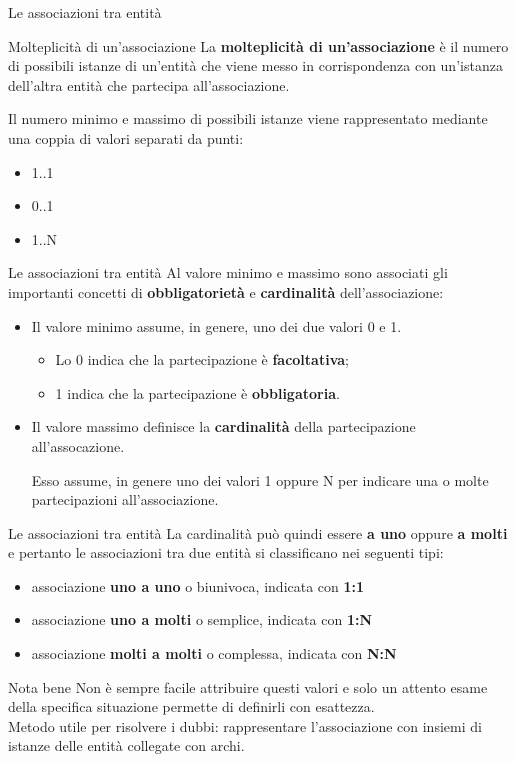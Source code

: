 %
\begin{frame}{Le associazioni tra entit\`a}
\begin{block}{Molteplicit\`a di un'associazione}
La \textbf{molteplicit\`a di un'associazione} \`e il numero di possibili istanze di un'entit\`a che viene messo in corrispondenza con un'istanza dell'altra entit\`a che partecipa all'associazione.
\end{block}
\pause
Il numero minimo e massimo di possibili istanze viene rappresentato mediante una coppia di valori separati da punti: 
\begin{itemize}
    \item 1..1
    \item 0..1
    \item 1..N
\end{itemize}
\end{frame}
%
\begin{frame}{Le associazioni tra entit\`a}
Al valore minimo e massimo sono associati gli importanti concetti di \textbf{obbligatoriet\`a} e \textbf{cardinalit\`a} dell'associazione:
\begin{itemize}[<+->]
    \item Il valore minimo assume, in genere, uno dei due valori 0 e 1.
    \begin{itemize}
        \item Lo 0 indica che la partecipazione \`e \textbf{facoltativa};
        \item 1 indica che la partecipazione \`e \textbf{obbligatoria}.
    \end{itemize}
    \item Il valore massimo definisce la \textbf{cardinalit\`a} della partecipazione all'assocazione.
    
    Esso assume, in genere uno dei valori 1 oppure N per indicare una o molte partecipazioni all'associazione.
\end{itemize}
\end{frame}
%
\begin{frame}{Le associazioni tra entit\`a}
\vspace{.5cm}
La cardinalit\`a pu\`o quindi essere \textbf{a uno} oppure \textbf{a molti} e pertanto le associazioni tra due entit\`a si classificano nei seguenti tipi:
\begin{itemize}[<+->]
    \item associazione \textbf{uno a uno} o biunivoca, indicata con \textbf{1:1}
    \item associazione \textbf{uno a molti} o semplice, indicata con \textbf{1:N}
    \item associazione \textbf{molti a molti} o complessa, indicata con \textbf{N:N}
\end{itemize}
\begin{block}{Nota bene}
Non \`e sempre facile attribuire questi valori e solo un attento esame della specifica situazione permette di definirli con esattezza.
\pause
\newline
\\Metodo utile per risolvere i dubbi: rappresentare l'associazione con insiemi di istanze delle entit\`a collegate con archi.
\end{block}
\end{frame}
